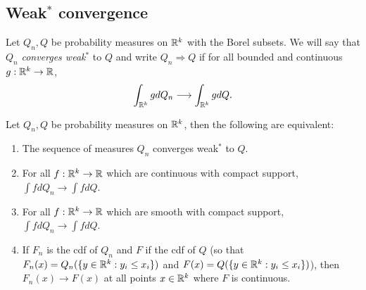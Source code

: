 \subsection{Weak$^*$ convergence}
\begin{defn}
    Let $Q_n,Q$ be probability measures on ${\mathbb R}^k$ with the Borel subsets. We will say that $Q_n$ \emph{converges weak$^*$} to $Q$  and write $Q_n \Rightarrow Q$ if for all bounded and continuous $g: {\mathbb R}^k \to {\mathbb R}$,
    \[\int_{{\mathbb R}^k}g dQ_n \longrightarrow \int_{{\mathbb R}^k}g dQ. \]  
\end{defn}
\begin{thrm}[Portmanteau]
    Let $Q_n,Q$ be probability measures on ${\mathbb R}^k$, then the following are equivalent:
    \begin{enumerate}
        \item The sequence of measures $Q_n$ converges weak$^*$ to $Q$.
        \item For all $f:{\mathbb R}^k \to {\mathbb R}$ which are continuous with compact support, $\int f dQ_n \to \int f dQ$.
        \item For all $f : {\mathbb R}^k \to {\mathbb R}$ which are smooth with compact support, $\int fdQ_n \to \int fdQ$.
        \item If $F_n$ is the cdf of $Q_n$ and $F$ if the cdf of $Q$ (so that $F_n(x) = Q_n(\{y \in {\mathbb R}^k: y_i \le x_i\})$ and $F(x) = Q(\{y \in {\mathbb R}^k: y_i \le x_i\})$), then $F_n(x) \to F(x)$ at all points $x \in {\mathbb R}^k$ where $F$ is continuous. 
    \end{enumerate}
\end{thrm}
